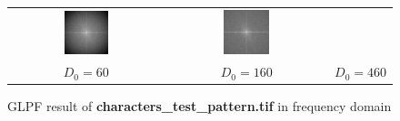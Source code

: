 \documentclass[11pt,a4paper]{article}
\begin{document}
\begin{figure}[!htbp]
\begin{tabular}{ccc}
		\includegraphics[width=0.3\textwidth]{pro3/GLPF/GLPF_160_spectrum}&
		\includegraphics[width=0.3\textwidth]{pro3/GLPF/GLPF_460_spectrum} \\
		 $D_0=60$ &  $D_0=160$ &  $D_0=460$
	\end{tabular}
	\caption{GLPF result of \textbf{characters\_test\_pattern.tif} in frequency domain}
	\label{pro3_fig4}
\end{figure}
\end{document}
